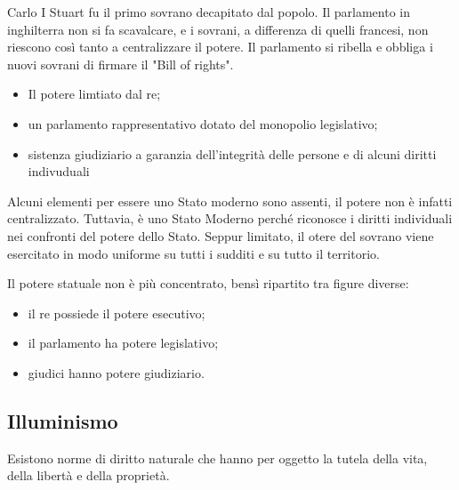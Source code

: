 \documentclass[a4paper]{article}
\begin{document}
Carlo I Stuart fu il primo sovrano decapitato dal popolo.
Il parlamento in inghilterra non si fa scavalcare, e i sovrani, a differenza di quelli francesi,
non riescono così tanto a centralizzare il potere.
Il parlamento si ribella e obbliga i nuovi sovrani di firmare il "Bill of rights".


\begin{itemize}
    \item Il potere limtiato dal re;
    \item un parlamento rappresentativo dotato del monopolio legislativo;
    \item sistenza giudiziario a garanzia dell'integrità delle persone e di alcuni diritti indivuduali
\end{itemize}

Alcuni elementi per essere uno Stato moderno sono assenti, il potere non è infatti centralizzato.
Tuttavia, è uno Stato Moderno perché riconosce i diritti individuali nei confronti del potere dello Stato.
Seppur limitato, il otere del sovrano viene esercitato in modo uniforme su tutti i sudditi e su tutto il territorio.

Il potere statuale non è più concentrato, bensì ripartito tra figure diverse:
\begin{itemize}
    \item il re possiede il potere esecutivo;
    \item il parlamento ha potere legislativo;
    \item giudici hanno potere giudiziario.
\end{itemize}


\subsection{Illuminismo}



Esistono norme di diritto naturale che hanno per oggetto la tutela della vita, della libertà e della proprietà.
\end{document}
